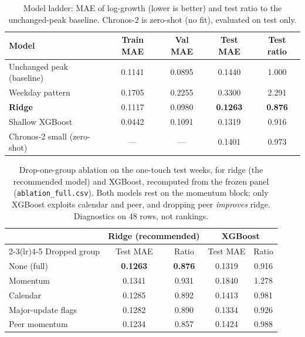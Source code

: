 \documentclass[10pt,letterpaper]{article}
\begin{document}
\FloatBarrier
\begin{table}[H]
\centering\small
\caption{Model ladder: MAE of log-growth (lower is better) and test ratio to the unchanged-peak baseline. Chronos-2 is zero-shot (no fit), evaluated on test only.}
\label{tab:ladder}
\begin{tabular}{lcccc}
\toprule
Model & Train MAE & Val MAE & Test MAE & Test ratio \\
\midrule
Unchanged peak (baseline) & 0.1141 & 0.0895 & 0.1440 & 1.000 \\
Weekday pattern & 0.1705 & 0.2255 & 0.3300 & 2.291 \\
\textbf{Ridge} & 0.1117 & 0.0980 & \textbf{0.1263} & \textbf{0.876} \\
Shallow XGBoost & 0.0442 & 0.1091 & 0.1319 & 0.916 \\
Chronos-2 small (zero-shot) & --- & --- & 0.1401 & 0.973 \\
\bottomrule
\end{tabular}
\end{table}

\begin{table}[H]
\centering\small
\caption{Drop-one-group ablation on the one-touch test weeks, for ridge (the recommended model) and XGBoost, recomputed from the frozen panel (\texttt{ablation\_full.csv}). Both models rest on the momentum block; only XGBoost exploits calendar and peer, and dropping peer \emph{improves} ridge. Diagnostics on 48 rows, not rankings.}
\label{tab:ablation}
\begin{tabular}{lcccc}
\toprule
& \multicolumn{2}{c}{Ridge (recommended)} & \multicolumn{2}{c}{XGBoost} \\
\cmidrule(lr){2-3}\cmidrule(lr){4-5}
Dropped group & Test MAE & Ratio & Test MAE & Ratio \\
\midrule
None (full) & \textbf{0.1263} & \textbf{0.876} & 0.1319 & 0.916 \\
Momentum & 0.1341 & 0.931 & 0.1840 & 1.278 \\
Calendar & 0.1285 & 0.892 & 0.1413 & 0.981 \\
Major-update flags & 0.1282 & 0.890 & 0.1334 & 0.926 \\
Peer momentum & 0.1234 & 0.857 & 0.1424 & 0.988 \\
\bottomrule
\end{tabular}
\end{table}
\end{document}

